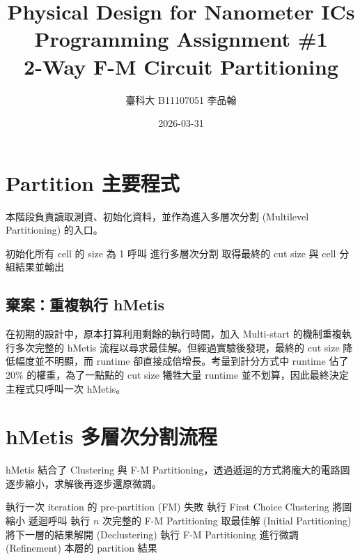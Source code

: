 \documentclass[12pt]{article}
\begin{document}
\title{Physical Design for Nanometer ICs\\Programming Assignment \#1\\2-Way F-M Circuit Partitioning}
\author{臺科大 B11107051 李品翰}
\date{2026-03-31}
\maketitle

\section{Partition 主要程式}

本階段負責讀取測資、初始化資料，並作為進入多層次分割 (Multilevel Partitioning) 的入口。

\begin{algorithm}[H]
\caption{Main Partition Flow}
\begin{algorithmic}[1]
\State 初始化所有 cell 的 size 為 1
\State 呼叫  進行多層次分割
\State 取得最終的 cut size 與 cell 分組結果並輸出
\end{algorithmic}
\end{algorithm}

\subsection{棄案：重複執行 hMetis}
在初期的設計中，原本打算利用剩餘的執行時間，加入 Multi-start 的機制重複執行多次完整的 hMetis 流程以尋求最佳解。但經過實驗後發現，最終的 cut size 降低幅度並不明顯，而 runtime 卻直接成倍增長。考量到計分方式中 runtime 佔了 20\% 的權重，為了一點點的 cut size 犧牲大量 runtime 並不划算，因此最終決定主程式只呼叫一次 hMetis。

\section{hMetis 多層次分割流程}

hMetis 結合了 Clustering 與 F-M Partitioning，透過遞迴的方式將龐大的電路圖逐步縮小，求解後再逐步還原微調。

\begin{algorithm}[H]
\caption{hMetis Recursive Flow}
\begin{algorithmic}[1]
\State 執行一次 iteration 的 pre-partition (FM)
    \State \Return 失敗
\EndIf
\State 執行 First Choice Clustering 將圖縮小
\State 遞迴呼叫 
    \State 執行 $n$ 次完整的 F-M Partitioning 取最佳解 (Initial Partitioning)
\Else
    \State 將下一層的結果解開 (Declustering)
    \State 執行 F-M Partitioning 進行微調 (Refinement)
\EndIf
\State \Return 本層的 partition 結果
\end{algorithmic}
\end{algorithm}
\end{document}
